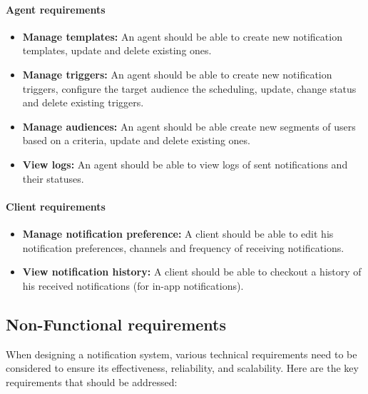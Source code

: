 \paragraph{Agent requirements}
\label{agent-req}
\begin{itemize}
    \item \textbf{Manage templates:} An agent should be able to create new notification templates, update and
    delete existing ones.
    \item \textbf{Manage triggers:} An agent should be able to create new notification triggers, configure
    the target audience the scheduling, update, change status and delete existing triggers.
    \item \textbf{Manage audiences:} An agent should be able create new segments of users based on a
    criteria, update and delete existing ones.
    \item \textbf{View logs:} An agent should be able to view logs of sent notifications and their statuses.
\end{itemize}

\paragraph{Client requirements}
\label{client-req}
\begin{itemize}
    \item \textbf{Manage notification preference:} A client should be able to edit his notification preferences,
    channels and frequency of receiving notifications.
    \item \textbf{View notification history:} A client should be able to checkout a history of his received 
    notifications (for in-app notifications).
\end{itemize}

\subsection{Non-Functional requirements}
\label{nfr}
When designing a notification system, various technical requirements need to be considered to ensure 
its effectiveness, reliability, and scalability. Here are the key requirements that should be addressed:

